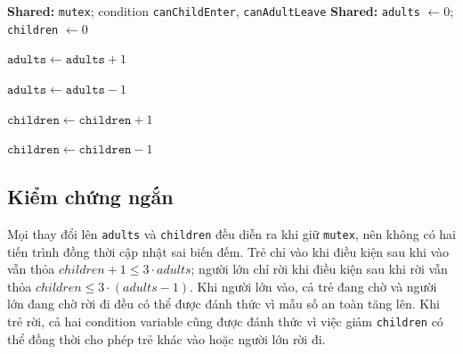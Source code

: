 \label{alg:child-care}
\begin{algorithmic}[1]
\State \textbf{Shared:} \texttt{mutex}; condition \texttt{canChildEnter}, \texttt{canAdultLeave}
\State \textbf{Shared:} \texttt{adults} $\leftarrow 0$; \texttt{children} $\leftarrow 0$

    \State {}
    \State $\texttt{adults} \gets \texttt{adults} + 1$
    \State {}
    \State {}
    \State {}
\EndProcedure

    \State {}
        \State {}
    \EndWhile
    \State $\texttt{adults} \gets \texttt{adults} - 1$
    \State {}
    \State {}
    \State {}
\EndProcedure

    \State {}
        \State {}
    \EndWhile
    \State $\texttt{children} \gets \texttt{children} + 1$
    \State {}
\EndProcedure

    \State {}
    \State $\texttt{children} \gets \texttt{children} - 1$
    \State {}
    \State {}
    \State {}
\EndProcedure
\end{algorithmic}

\subsection{Kiểm chứng ngắn}

Mọi thay đổi lên \texttt{adults} và \texttt{children} đều diễn ra khi giữ \texttt{mutex}, nên không có hai tiến trình đồng thời cập nhật sai biến đếm. Trẻ chỉ vào khi điều kiện sau khi vào vẫn thỏa $children + 1 \le 3 \cdot adults$; người lớn chỉ rời khi điều kiện sau khi rời vẫn thỏa $children \le 3 \cdot (adults - 1)$. Khi người lớn vào, cả trẻ đang chờ và người lớn đang chờ rời đi đều có thể được đánh thức vì mẫu số an toàn tăng lên. Khi trẻ rời, cả hai condition variable cũng được đánh thức vì việc giảm \texttt{children} có thể đồng thời cho phép trẻ khác vào hoặc người lớn rời đi.

